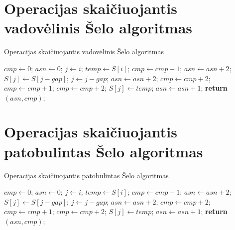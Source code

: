 \documentclass{VUMIFInfKursinis}
\begin{document}
\printbibliography[heading=bibintoc] %

\appendix  %

\section{Operacijas skaičiuojantis vadovėlinis Šelo algoritmas}
\begin{algorithm}[H]
  \caption{Operacijas skaičiuojantis vadovėlinis Šelo algoritmas}
  \label{alg:tss_reported}
  \begin{algorithmic}[1]
  \State $cmp\gets 0$; $asn\gets 0$;
      \State $j\gets i$; $temp\gets S[i]$;
      \State $cmp\gets cmp+1$; $asn\gets asn+2$;
        \State $S[j]\gets S[j - gap]$;
        \State $j\gets j-gap$;
        \State $asn\gets asn+2$; $cmp\gets cmp+2$;
      \EndWhile
        \State $cmp\gets cmp+1$;
      \Else
        \State $cmp\gets cmp+2$;
      \EndIf
      \State $S[j]\gets temp$;
      \State $asn\gets asn+1$;
    \EndFor
  \EndFor
  \State \textbf{return} $(asn, cmp)$;
  \end{algorithmic}
\end{algorithm}

\section{Operacijas skaičiuojantis patobulintas Šelo algoritmas}
\begin{algorithm}[H]
  \caption{Operacijas skaičiuojantis patobulintas Šelo algoritmas}
  \label{alg:iss_reported}
  \begin{algorithmic}[1]
  \State $cmp\gets 0$; $asn\gets 0$;
      \State $j\gets i$; $temp\gets S[i]$;
      \State $cmp\gets cmp+1$; $asn\gets asn+2$;
        \State $S[j]\gets S[j - gap]$;
        \State $j\gets j-gap$;
        \State $asn\gets asn+2$; $cmp\gets cmp+2$;
      \EndWhile
        \State $cmp\gets cmp+1$;
      \Else
        \State $cmp\gets cmp+2$;
      \EndIf
      \State $S[j]\gets temp$;
      \State $asn\gets asn+1$;
    \EndFor
  \EndFor
  \State \textbf{return} $(asn, cmp)$;
  \end{algorithmic}
\end{algorithm}
\end{document}
